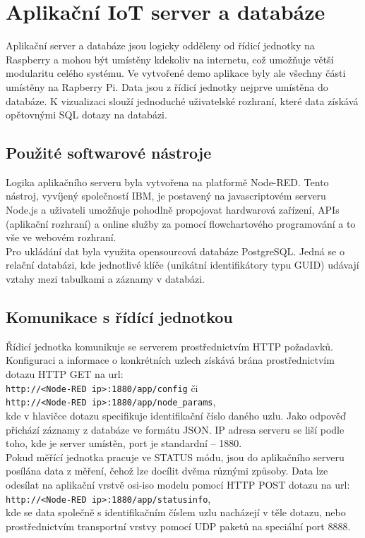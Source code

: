     
   
   
   
\section{Aplikační IoT server a databáze}
    Aplikační server a databáze jsou logicky odděleny od řídicí jednotky na Raspberry a mohou být umístěny kdekoliv na internetu, což umožňuje větší modularitu celého systému. Ve vytvořené demo aplikace byly ale všechny části umístěny na Rapberry Pi. Data jsou z řídicí jednotky nejprve umístěna do databáze. K vizualizaci slouží jednoduché uživatelské rozhraní, které data získává opětovnými SQL dotazy na databázi.
    
\subsection{Použité softwarové nástroje}
    Logika aplikačního serveru byla vytvořena na platformě Node-RED. Tento nástroj, vyvíjený společností IBM, je postavený na javascriptovém serveru Node.js a uživateli umožňuje pohodlně propojovat hardwarová zařízení, APIs (aplikační rozhraní) a online služby za pomocí flowchartového programování a to vše ve webovém rozhraní.\\ 
    Pro ukládání dat byla využita opensourcová databáze PostgreSQL. Jedná se o relační databázi, kde jednotlivé klíče (unikátní identifikátory typu GUID) udávají vztahy mezi tabulkami a záznamy v databázi.


\subsection{Komunikace s řídící jednotkou}
    Řídicí jednotka komunikuje se serverem prostřednictvím HTTP požadavků.\\
    Konfiguraci a informace o konkrétních uzlech získává brána prostřednictvím dotazu HTTP GET na url:\\ 
    \texttt{http://<Node-RED ip>:1880/app/config} či \\
    \texttt{http://<Node-RED ip>:1880/app/node\_params},\\
    kde v hlavičce dotazu specifikuje identifikační číslo daného uzlu. Jako odpověď přichází záznamy z databáze ve formátu JSON. IP adresa serveru se liší podle toho, kde je server umístěn, port je standardní – 1880.\\
    Pokud měřící jednotka pracuje ve STATUS módu, jsou do aplikačního serveru posílána data z měření, čehož lze docílit dvěma různými způsoby. Data lze odesílat na aplikační vrstvě osi-iso modelu pomocí HTTP POST dotazu na url:\\
    \texttt{http://<Node-RED ip>:1880/app/statusinfo}, \\
    kde se data společně s identifikačním číslem uzlu nacházejí v těle dotazu, nebo prostřednictvím transportní vrstvy pomocí UDP paketů na speciální port 8888.
    
